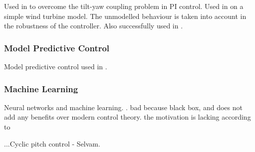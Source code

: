 Used in \cite{1_Lu} to overcome the tilt-yaw coupling problem in PI control. Used in \citet{17_Geyler} on a simple wind turbine model. The unmodelled behaviour is taken into account in the robustness of the \hinfty controller. Also successfully used in \citet{2_Kanev}.
\subsubsection{Model Predictive Control}
Model predictive control used in \cite{6_Mirzaei}.
\subsubsection{Machine Learning}

Neural networks and machine learning. \cite{8_Wang} \cite{3_Treiber}. bad because black box, and does not add any benefits over modern control theory. the motivation is lacking according to \citet{15_bossanyi}

...Cyclic pitch control - Selvam.




